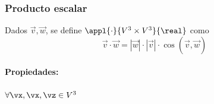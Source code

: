 












\subsubsection{Producto escalar}

\begin{defn}

Dados $\vec{v},\vec{w}$, se define $\appl{\cdot}{V^3\times V^3}{\real}$ como 
\[\vec{v}·\vec{w} = |\vec{w}|·|\vec{v}|\cdot\cos\left(\widehat{\vec{v},\vec{w}}\right)\]
\end{defn}

\paragraph{Propiedades:} $\forall\vx,\vx,\vz\in V^3$

